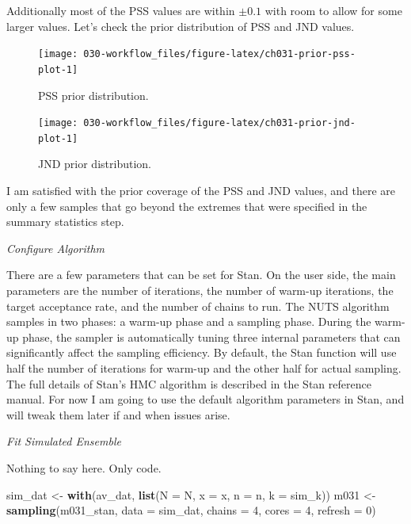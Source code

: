 \documentclass[11pt, oneside, openany]{scrbook}
\newenvironment{Shaded}{\begin{snugshade}}{\end{snugshade}}
\newcommand{\DataTypeTok}[1]{\textcolor[rgb]{0.13,0.29,0.53}{#1}}
\newcommand{\DecValTok}[1]{\textcolor[rgb]{0.00,0.00,0.81}{#1}}
\newcommand{\KeywordTok}[1]{\textcolor[rgb]{0.13,0.29,0.53}{\textbf{#1}}}
\newcommand{\NormalTok}[1]{#1}
\newcommand{\StringTok}[1]{\textcolor[rgb]{0.31,0.60,0.02}{#1}}
\begin{document}
Additionally most of the PSS values are within \(\pm 0.1\) with room to allow for some larger values. Let's check the prior distribution of PSS and JND values.

\begin{figure}

{\centering \texttt{[image: 030-workflow\_files/figure-latex/ch031-prior-pss-plot-1]} 

}

\caption{PSS prior distribution.}\label{fig:ch031-prior-pss-plot}
\end{figure}

\begin{figure}

{\centering \texttt{[image: 030-workflow\_files/figure-latex/ch031-prior-jnd-plot-1]} 

}

\caption{JND prior distribution.}\label{fig:ch031-prior-jnd-plot}
\end{figure}

I am satisfied with the prior coverage of the PSS and JND values, and there are only a few samples that go beyond the extremes that were specified in the summary statistics step.

\emph{Configure Algorithm}

There are a few parameters that can be set for Stan. On the user side, the main parameters are the number of iterations, the number of warm-up iterations, the target acceptance rate, and the number of chains to run. The NUTS algorithm samples in two phases: a warm-up phase and a sampling phase. During the warm-up phase, the sampler is automatically tuning three internal parameters that can significantly affect the sampling efficiency. By default, the Stan function will use half the number of iterations for warm-up and the other half for actual sampling. The full details of Stan's HMC algorithm is described in the Stan reference manual. For now I am going to use the default algorithm parameters in Stan, and will tweak them later if and when issues arise.

\emph{Fit Simulated Ensemble}

Nothing to say here. Only code.


\begin{Shaded}
\begin{Highlighting}[]
\NormalTok{sim_dat <-}\StringTok{ }\KeywordTok{with}\NormalTok{(av_dat, }\KeywordTok{list}\NormalTok{(}\DataTypeTok{N =}\NormalTok{ N, }\DataTypeTok{x =}\NormalTok{ x, }\DataTypeTok{n =}\NormalTok{ n, }\DataTypeTok{k =}\NormalTok{ sim_k)) }
\NormalTok{m031 <-}\StringTok{ }\KeywordTok{sampling}\NormalTok{(m031_stan, }\DataTypeTok{data =}\NormalTok{ sim_dat, }
                 \DataTypeTok{chains =} \DecValTok{4}\NormalTok{, }\DataTypeTok{cores =} \DecValTok{4}\NormalTok{, }\DataTypeTok{refresh =} \DecValTok{0}\NormalTok{)}
\end{Highlighting}
\end{Shaded}
\end{document}
